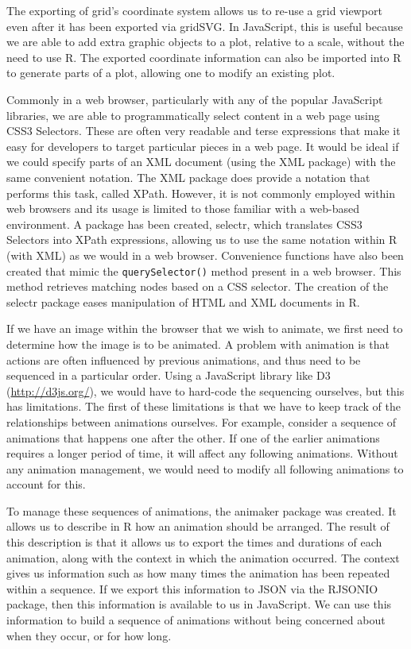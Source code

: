 \documentclass[11pt, a4paper]{article}
\newcommand{\grid}{\textsf{grid}}
\newcommand{\R}{\textsf{R}}
\newcommand{\gridSVG}{\textsf{gridSVG}}
\newcommand{\JS}{\textsf{JavaScript}}
\newcommand{\pkg}[1]{\textsf{#1}}
\newcommand{\code}[1]{\texttt{#1}}
\newcommand{\tsc}[1]{{\small \textsc{#1}}}
\begin{document}
The exporting of \grid{}'s coordinate system allows us to re-use a
\grid{} viewport even after it has been exported via \gridSVG{}. In
\JS{}, this is useful because we are able to add extra graphic objects
to a plot, relative to a scale, without the need to use \R{}. The
exported coordinate information can also be imported into \R{} to
generate parts of a plot, allowing one to modify an existing plot.

Commonly in a web browser, particularly with any of the popular \JS{}
libraries, we are able to programmatically select content in a web
page using CSS3 Selectors. These are often very readable and terse
expressions that make it easy for developers to target particular
pieces in a web page. It would be ideal if we could specify parts of
an \tsc{XML} document (using the \pkg{XML} package) with the same
convenient notation. The \pkg{XML} package does provide a notation
that performs this task, called XPath. However, it is not commonly
employed within web browsers and its usage is limited to those
familiar with a web-based environment. A package has been created,
\pkg{selectr}, which translates CSS3 Selectors into XPath expressions,
allowing us to use the same notation within \R{} (with \pkg{XML}) as
we would in a web browser. Convenience functions have also been
created that mimic the \code{querySelector()} method present in a web
browser. This method retrieves matching nodes based on a CSS
selector. The creation of the \pkg{selectr} package eases manipulation
of \tsc{HTML} and \tsc{XML} documents in \R{}.

If we have an image within the browser that we wish to animate, we
first need to determine how the image is to be animated. A problem
with animation is that actions are often influenced by previous
animations, and thus need to be sequenced in a particular order. Using
a \JS{} library like D3 (\url{http://d3js.org/}), we would have to
hard-code the sequencing ourselves, but this has limitations. The
first of these limitations is that we have to keep track of the
relationships between animations ourselves. For example, consider a
sequence of animations that happens one after the other. If one of the
earlier animations requires a longer period of time, it will affect
any following animations. Without any animation management, we would
need to modify all following animations to account for this.

To manage these sequences of animations, the \pkg{animaker} package
was created. It allows us to describe in \R{} how an animation should
be arranged. The result of this description is that it allows us to
export the times and durations of each animation, along with the
context in which the animation occurred. The context gives us
information such as how many times the animation has been repeated
within a sequence. If we export this information to \tsc{JSON} via the
\pkg{RJSONIO} package, then this information is available to us in
\JS{}. We can use this information to build a sequence of animations
without being concerned about when they occur, or for how long.
\end{document}
